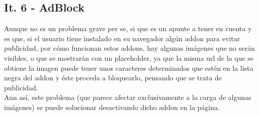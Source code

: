 \subsection{It. 6 - AdBlock}

Aunque no es un problema grave per se, si que es un apunte a tener en cuenta y es que, si el usuario tiene instalado en su navegador algún addon para evitar publicidad, por cómo funcionan estos addons, hay algunas imágenes que no serán visibles, o que se mostrarán con un placeholder, ya que la misma url de la que se obtiene la imagen puede tener unos caracteres determinados que estén en la lista negra del addon y éste proceda a bloquearlo, pensando que se trata de publicidad.\\

Aun así, este problema (que parece afectar exclusivamente a la carga de algunas imágenes) se puede solucionar desactivando dicho addon en la página.\\





	